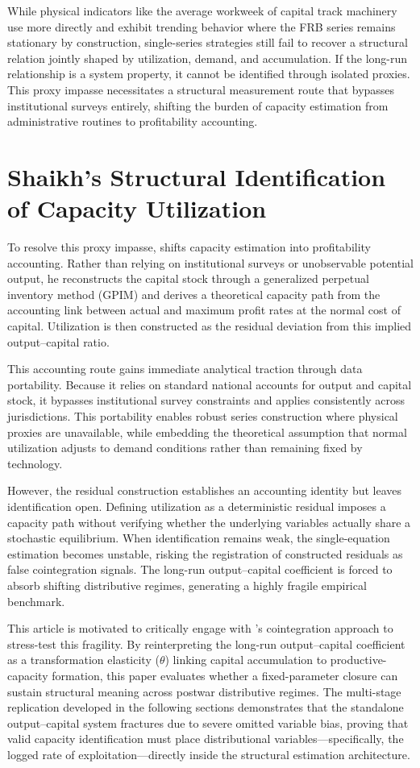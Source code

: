 While physical indicators like the average workweek of capital track machinery use more directly and exhibit trending behavior where the FRB series remains stationary by construction, single-series strategies still fail to recover a structural relation jointly shaped by utilization, demand, and accumulation. If the long-run relationship is a system property, it cannot be identified through isolated proxies. This proxy impasse necessitates a structural measurement route that bypasses institutional surveys entirely, shifting the burden of capacity estimation from administrative routines to profitability accounting.

\section{Shaikh’s Structural Identification of Capacity Utilization}

To resolve this proxy impasse, \citet{Shaikh2016} shifts capacity estimation into profitability accounting. Rather than relying on institutional surveys or unobservable potential output, he reconstructs the capital stock through a generalized perpetual inventory method (GPIM) and derives a theoretical capacity path from the accounting link between actual and maximum profit rates at the normal cost of capital. Utilization is then constructed as the residual deviation from this implied output–capital ratio.

This accounting route gains immediate analytical traction through data portability. Because it relies on standard national accounts for output and capital stock, it bypasses institutional survey constraints and applies consistently across jurisdictions. This portability enables robust series construction where physical proxies are unavailable, while embedding the theoretical assumption that normal utilization adjusts to demand conditions rather than remaining fixed by technology.

However, the residual construction establishes an accounting identity but leaves identification open. Defining utilization as a deterministic residual imposes a capacity path without verifying whether the underlying variables actually share a stochastic equilibrium. When identification remains weak, the single-equation estimation becomes unstable, risking the registration of constructed residuals as false cointegration signals. The long-run output–capital coefficient is forced to absorb shifting distributive regimes, generating a highly fragile empirical benchmark.

This article is motivated to critically engage with \citet{Shaikh2016}'s cointegration approach to stress-test this fragility. By reinterpreting the long-run output–capital coefficient as a transformation elasticity ($\theta$) linking capital accumulation to productive-capacity formation, this paper evaluates whether a fixed-parameter closure can sustain structural meaning across postwar distributive regimes. The multi-stage replication developed in the following sections demonstrates that the standalone output–capital system fractures due to severe omitted variable bias, proving that valid capacity identification must place distributional variables—specifically, the logged rate of exploitation—directly inside the structural estimation architecture.